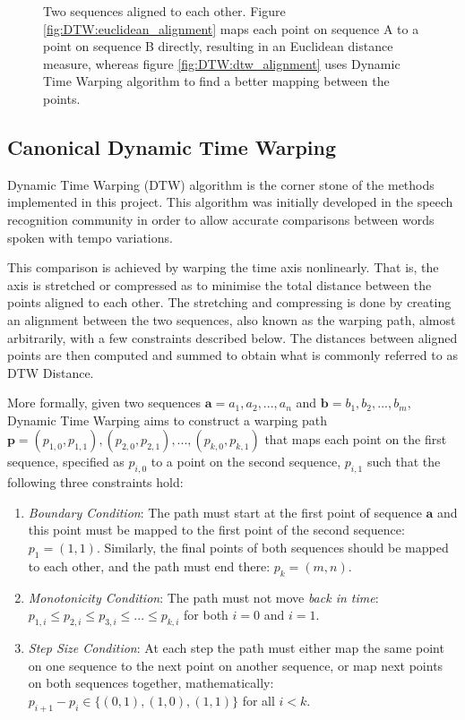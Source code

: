 \documentclass[parskip]{cs4rep}
\begin{document}
\begin{figure}[b,t]
   \caption{Two sequences aligned to each other. Figure \ref{fig:DTW:euclidean_alignment} maps each point on sequence A to a point on sequence B directly, resulting in an Euclidean distance measure, whereas figure \ref{fig:DTW:dtw_alignment} uses Dynamic Time Warping algorithm to find a better mapping between the points.}
   \label{fig:DTW:alignments}
\end{figure}

\subsection{Canonical Dynamic Time Warping}

Dynamic Time Warping (DTW) algorithm is the corner stone of the methods implemented in this project. This algorithm was initially developed in the speech recognition community in order to allow accurate comparisons between words spoken with tempo variations. 

This comparison is achieved by warping the time axis nonlinearly. That is, the axis is stretched or compressed as to minimise the total distance between the points aligned to each other. The stretching and compressing is done by creating an alignment between the two sequences, also known as the warping path, almost arbitrarily, with a few constraints described below. The distances between aligned points are then computed and summed to obtain what is commonly referred to as DTW Distance.

More formally, given two sequences $\mathbf{a} = a_1, a_2, ..., a_n$ and $\mathbf{b} = b_1, b_2, ..., b_m$, Dynamic Time Warping aims to construct a warping path $\mathbf{p} = { (p_{1,0}, p_{1,1}), (p_{2,0}, p_{2,1}), ..., (p_{k,0}, p_{k, 1}) }$ that maps each point on the first sequence, specified as $p_{i,0}$ to a point on the second sequence, $p_{i,1}$ such that the following three constraints hold:

\begin{enumerate}
\item \emph{Boundary Condition}: The path must start at the first point of sequence $\mathbf{a}$ and this point must be mapped to the first point of the second sequence: $p_1 = (1,1)$. Similarly, the final points of both sequences should be mapped to each other, and the path must end there: $p_k = (m, n).$ 
\item \emph{Monotonicity Condition}: The path must not move \emph{back in time}: 
    $p_{1,i} \le p_{2,i} \le p_{3,i} \le ... \le p_{k, i}$ for both $i=0$ and $i=1$.
\item \emph{Step Size Condition}: At each step the path must either map the same point on one sequence to the next point on another sequence, or map next points on both sequences together, mathematically:
    $p_{i+1} - p_{i} \in \{(0,1), (1,0), (1,1)\}$ for all $i < k$.
\end{enumerate}
\end{document}
